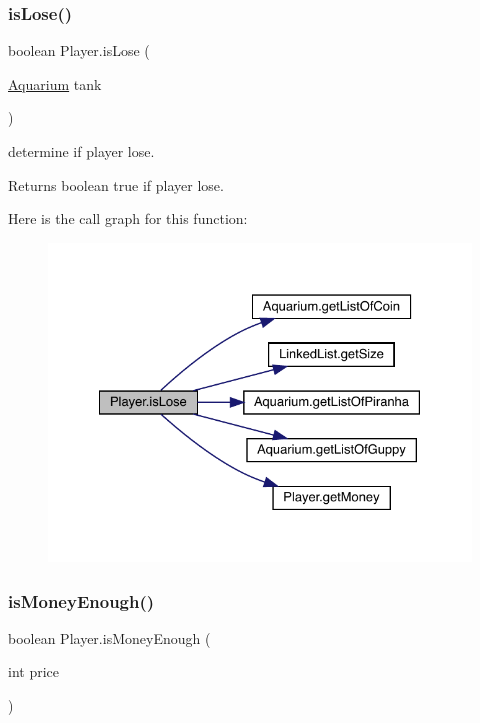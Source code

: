 \subsubsection{\texorpdfstring{is\+Lose()}{isLose()}}
{\footnotesize\ttfamily boolean Player.\+is\+Lose (\begin{DoxyParamCaption}\item[{\mbox{\hyperlink{class_aquarium}{Aquarium}}}]{tank }\end{DoxyParamCaption})\hspace{0.3cm}{\ttfamily [inline]}}

determine if player lose. \begin{DoxyReturn}{Returns}
boolean true if player lose. 
\end{DoxyReturn}
Here is the call graph for this function\+:
\nopagebreak
\begin{figure}[H]
\begin{center}
\leavevmode
\includegraphics[width=328pt]{class_player_a612fdd92f5c71a5dd8c3cd9ead192546_cgraph}
\end{center}
\end{figure}
\mbox{\label{class_player_a5836d6213f249c1928423d9036ec9e4e}} 
\subsubsection{\texorpdfstring{is\+Money\+Enough()}{isMoneyEnough()}}
{\footnotesize\ttfamily boolean Player.\+is\+Money\+Enough (\begin{DoxyParamCaption}\item[{int}]{price }\end{DoxyParamCaption})\hspace{0.3cm}{\ttfamily [inline]}}

